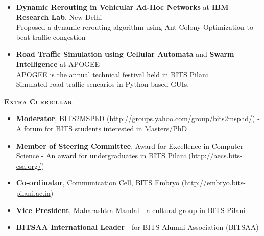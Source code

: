 \documentclass[11pt]{article}
\begin{document}
\begin{itemize}\addtolength{\itemsep}{-0.5\baselineskip}
	\item{\textbf{Dynamic Rerouting in Vehicular Ad-Hoc Networks} at \textbf{IBM Research Lab}, New Delhi}\\
	\textendash Proposed a dynamic rerouting algorithm using Ant Colony Optimization to beat traffic congestion\\
	\item{\textbf{Road Traffic Simulation using Cellular Automata} and \textbf{Swarm Intelligence} at APOGEE}\\
	\textendash APOGEE is the annual technical festival held in BITS Pilani\\
	\textendash Simulated road traffic scnearios in Python based GUIs.
\end{itemize}
\begin{mdframed}[backgroundcolor=light-gray, linecolor=light-gray, roundcorner=10pt, shadow=false, shadowsize=1pt]
\Large{\textbf{\textsc{Extra Curricular}}}
\end{mdframed}
\begin{itemize}\addtolength{\itemsep}{-0.5\baselineskip}
	\item{\textbf{Moderator}, BITS2MSPhD (\url{http://groups.yahoo.com/group/bits2msphd/}) - A forum for BITS students interested in Masters/PhD}
	\item{\textbf{Member of Steering Committee},  Award for Excellence in Computer Science - An award for undergraduates in BITS Pilani (\url{http://aecs.bits-csa.org/})}
	\item{\textbf{Co-ordinator}, Communication Cell, BITS Embryo (\url{http://embryo.bits-pilani.ac.in})}
	\item{\textbf{Vice President}, Maharashtra Mandal - a cultural group in BITS Pilani}
	\item{\textbf{BITSAA International Leader} - for BITS Alumni Association (BITSAA)}
\end{itemize}
\end{document}
